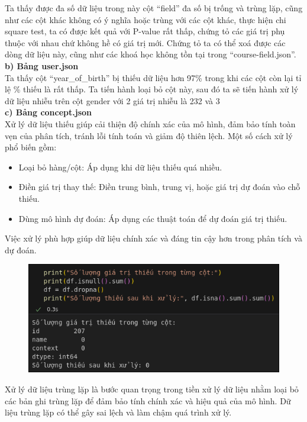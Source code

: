 Ta thấy được đa số dữ liệu trong này cột “field” đa số bị trống và trùng lặp, cũng như các cột khác không có ý nghĩa hoặc trùng với các cột khác, thực hiện chi square test, ta có được kết quả với P-value rất thấp, chứng tỏ các giá trị phụ thuộc với nhau chứ không hề có giá trị mới. Chứng tỏ ta có thể xoá được các dòng dữ liệu này, cũng như các khoá học không tồn tại trong “course-field.json”.\\
\textbf{b) Bảng user.json}\\
Ta thấy cột “year\_of\_birth” bị thiếu dữ liệu hơn 97\% trong khi các cột còn lại tỉ lệ \% thiếu là rất thấp. Ta tiến hành loại bỏ cột này, sau đó ta sẽ tiến hành xử lý dữ liệu nhiễu trên cột gender với 2 giá trị nhiễu là 232 và 3\\
\textbf{c) Bảng concept.json}\\
Xử lý dữ liệu thiếu giúp cải thiện độ chính xác của mô hình, đảm bảo tính toàn vẹn của phân tích, tránh lỗi tính toán và giảm độ thiên lệch. Một số cách xử lý phổ biến gồm:\\
\begin{itemize}
    \item Loại bỏ hàng/cột: Áp dụng khi dữ liệu thiếu quá nhiều.
    \item Điền giá trị thay thế: Điền trung bình, trung vị, hoặc giá trị dự đoán vào chỗ thiếu.
    \item Dùng mô hình dự đoán: Áp dụng các thuật toán để dự đoán giá trị thiếu.
\end{itemize}
Việc xử lý phù hợp giúp dữ liệu chính xác và đáng tin cậy hơn trong phân tích và dự đoán.\\
\newpage
\begin{figure}
    \centering
    \includegraphics[width=1\linewidth]{figures/46.png}
\end{figure}
Xử lý dữ liệu trùng lặp là bước quan trọng trong tiền xử lý dữ liệu nhằm loại bỏ các bản ghi trùng lặp để đảm bảo tính chính xác và hiệu quả của mô hình. Dữ liệu trùng lặp có thể gây sai lệch và làm chậm quá trình xử lý.\\
